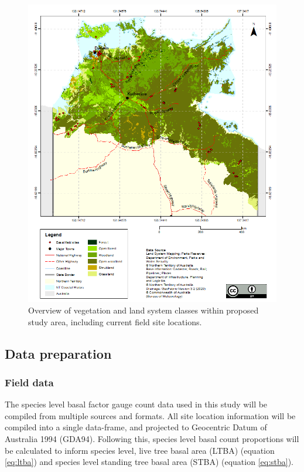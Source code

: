\begin{figure}[h!]
\label{fig:landsystemclass}
\centering
 \includegraphics[scale=0.75]{images/savanna.png}
 \caption{Overview of vegetation and land system classes within proposed study area, including current field site locations.}
\end{figure}

\vspace{40cm} %

\subsection{Data preparation}
\subsubsection{Field data}
The species level basal factor gauge count data used in this study will be compiled from multiple sources and formats. All site location information will be compiled into a single data-frame, and projected to Geocentric Datum of Australia 1994 (GDA94). Following this, species level basal count proportions will be calculated to inform species level, live tree basal area (LTBA) (equation \ref{eq:ltba}) and species level standing tree basal area (STBA) (equation \ref{eq:stba}). 


